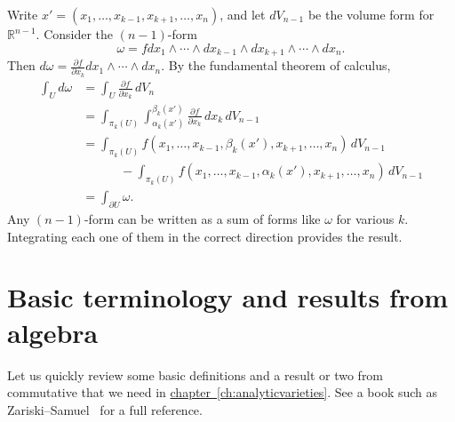 \documentclass[12pt,openany]{book}
\newcommand{\R}{{\mathbb{R}}}
\theoremstyle{plain}
\theoremstyle{remark}
\theoremstyle{definition}
\theoremstyle{exercise}
\theoremstyle{example}
\newcommand{\chapterref}[1]{\hyperref[#1]{chapter~\ref*{#1}}}
\begin{document}
Write $x' = (x_1,\ldots,x_{k-1},x_{k+1},\ldots,x_n)$, and let $dV_{n-1}$ be the
volume form for $\R^{n-1}$.
Consider the $(n-1)$-form
\begin{equation*}
\omega = f
dx_1 \wedge \cdots \wedge dx_{k-1} \wedge dx_{k+1} \wedge \cdots \wedge dx_n
.
\end{equation*}
Then $d\omega = \frac{\partial f}{\partial x_k} dx_1 \wedge \cdots \wedge
dx_n$.
By the fundamental theorem of
calculus,
\begin{equation*}
\begin{split}
\int_U d\omega &=
\int_U \frac{\partial f}{\partial x_k} \, dV_n
\\
& =
\int_{\pi_k(U)}
\int_{\alpha_k(x')}^{\beta_k(x')}
\frac{\partial f}{\partial x_k} \, dx_k \, dV_{n-1}
\\
& =
\int_{\pi_k(U)}
f(x_1,\ldots,x_{k-1}, \beta_k(x'), x_{k+1}, \ldots, x_n)
\,dV_{n-1}
\\
& \phantom{=xxx}
-
\int_{\pi_k(U)}
f(x_1,\ldots,x_{k-1}, \alpha_k(x'), x_{k+1}, \ldots, x_n)
\,dV_{n-1}
\\
& = 
\int_{\partial U} \omega .
\end{split}
\end{equation*}
Any $(n-1)$-form can be written as a sum of forms like $\omega$ for various
$k$.  Integrating each one of them in the correct direction provides the
result.


\chapter{Basic terminology and results from algebra} \label{ap:algebra}

Let us quickly review some basic definitions
and a result or two
from commutative
that we need in
\chapterref{ch:analyticvarieties}.  See a book such as
Zariski--Samuel~\cite{ZariskiSamuel} for a full reference.
\end{document}
